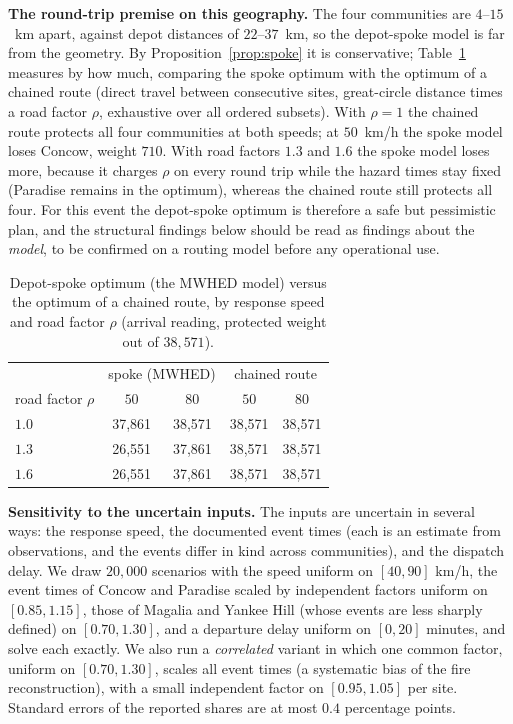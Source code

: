 \documentclass[pdflatex,sn-mathphys-ay]{sn-jnl}
\theoremstyle{thmstyleone}
\theoremstyle{thmstyletwo}
\theoremstyle{thmstylethree}
\begin{document}
\textbf{The round-trip premise on this geography.} The four communities
are $4$--$15$~km apart, against depot distances of $22$--$37$~km, so the
depot-spoke model is far from the geometry. By
Proposition~\ref{prop:spoke} it is conservative; Table~\ref{tab:campfire-route}
measures by how much, comparing the spoke optimum with the optimum of a
chained route (direct travel between consecutive sites, great-circle
distance times a road factor $\rho$, exhaustive over all ordered subsets).
With $\rho=1$ the chained route protects all four communities at both
speeds; at $50$~km/h the spoke model loses Concow, weight $710$. With
road factors $1.3$ and $1.6$ the spoke model loses more, because it
charges $\rho$ on every round trip while the hazard times stay fixed
(Paradise remains in the optimum), whereas the chained route still
protects all four. For this event the depot-spoke optimum is therefore a
safe but pessimistic plan, and the structural findings below should be read
as findings about the \emph{model}, to be confirmed on a routing model
before any operational use.

\begin{table}[h]
\caption{Depot-spoke optimum (the MWHED model) versus the optimum of a
chained route, by response speed and road factor $\rho$ (arrival reading,
protected weight out of $38{,}571$).}\label{tab:campfire-route}
\small
\begin{tabular}{@{}lcccc@{}}
\toprule
 & \multicolumn{2}{c}{spoke (MWHED)} & \multicolumn{2}{c}{chained route} \\
road factor $\rho$ & $50$ & $80$ & $50$ & $80$ \\
\midrule
$1.0$ & 37{,}861 & 38{,}571 & 38{,}571 & 38{,}571 \\
$1.3$ & 26{,}551 & 37{,}861 & 38{,}571 & 38{,}571 \\
$1.6$ & 26{,}551 & 37{,}861 & 38{,}571 & 38{,}571 \\
\bottomrule
\end{tabular}
\end{table}

\textbf{Sensitivity to the uncertain inputs.} The inputs are uncertain in
several ways: the response speed, the documented event times (each is an
estimate from observations, and the events differ in kind across
communities), and the dispatch delay. We draw $20{,}000$ scenarios with
the speed uniform on $[40,90]$ km/h, the event times of Concow and
Paradise scaled by independent factors uniform on $[0.85,1.15]$, those of
Magalia and Yankee Hill (whose events are less sharply defined) on
$[0.70,1.30]$, and a departure delay uniform on $[0,20]$ minutes, and
solve each exactly. We also run a \emph{correlated} variant in which one
common factor, uniform on $[0.70,1.30]$, scales all event times (a
systematic bias of the fire reconstruction), with a small independent
factor on $[0.95,1.05]$ per site. Standard errors of the reported shares
are at most $0.4$ percentage points.
\end{document}
